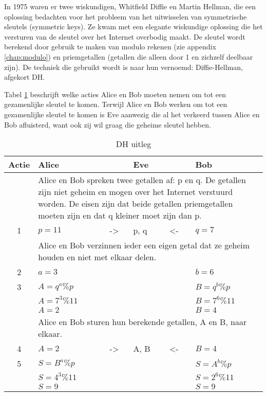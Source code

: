 In 1975 waren er twee wiskundigen, Whitfield Diffie en Martin Hellman, die een oplossing bedachten voor het probleem van het uitwisselen van symmetrische sleutels (symmetric keys). Ze kwam met een elegante wiskundige oplossing die het versturen van de sleutel over het Internet overbodig maakt. De sleutel wordt berekend door gebruik te maken van modulo rekenen (zie appendix \ref{chap:modulo}) en priemgetallen (getallen die alleen door 1 en zichzelf deelbaar zijn). De techniek die gebruikt wordt is naar hun vernoemd: Diffie-Hellman, afgekort DH.

Tabel \ref{tab:dh} beschrijft welke acties Alice en Bob moeten nemen om tot een gezamenlijke sleutel te komen. Terwijl Alice en Bob werken om tot een gezamenlijke sleutel te komen is Eve aanwezig die al het verkeerd tussen Alice en Bob afluisterd, want ook zij wil graag die geheime sleutel hebben.

\begin{table}[h]
\centering
\begin{tabularx}{\textwidth}{ | c | X | X | X | X | X | }
	\hline
	Actie & Alice & & Eve & & Bob \\
	\hline
	& \multicolumn{5}{p{0.86\textwidth}|}{Alice en Bob spreken twee getallen af: p en q. De getallen zijn niet geheim en mogen over het Internet verstuurd worden. De eisen zijn dat beide getallen priemgetallen moeten zijn en dat q kleiner moet zijn dan p.} \\
	\hline
	1 & $p=11$ & -> & p, q & <- & $q=7$ \\
	\hline
	& \multicolumn{5}{p{0.86\textwidth}|}{Alice en Bob verzinnen ieder een eigen getal dat ze geheim houden en niet met elkaar delen.} \\
	\hline
	2 & $a=3$ & & & & $b=6$ \\
	\hline
	3 & $A=q^a\%p$ & & & & $B=q^b\%p$ \\
	  & $A=7^3\%11$ & & & & $B=7^6\%11$ \\
	  & $A=2$ & & & & $B=4$ \\
	\hline
	& \multicolumn{5}{p{0.86\textwidth}|}{Alice en Bob sturen hun berekende getallen, A en B, naar elkaar.} \\
	\hline
	4 & $A=2$ & -> & A, B & <- & $B=4$ \\
	\hline
	5 & $S=B^a\%p$  & & & & $S=A^b\%p$ \\
	  & $S=4^3\%11$ & & & & $S=2^6\%11$ \\
	  & $S=9$       & & & & $S=9$ \\
	\hline
\end{tabularx}
\caption{DH uitleg}
\label{tab:dh}
\end{table}

